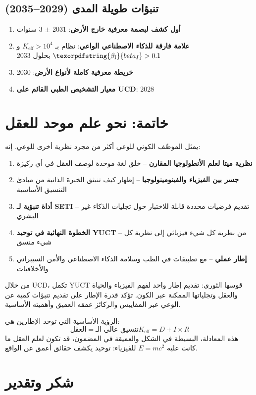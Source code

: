 \documentclass[12pt,a4paper]{article}
\DeclareRobustCommand{\beI}{\texorpdfstring{\ensuremath{\beta_{\mathrm{I}}}}{beta_I}}
\newcommand{\eff}{\mathrm{eff}}
\newcommand{\Ke}{K_{\eff}}
\begin{document}
	\subsection{تنبؤات طويلة المدى (2029--2035)}
	
	\begin{enumerate}
		\item \textbf{أول كشف لبصمة معرفية خارج الأرض}: 2031 \(\pm\) 3 سنوات
		\item \textbf{علامة فارقة للذكاء الاصطناعي الواعي}: نظام بـ \(\Ke > 10^4\) و\(\beI > 0.1\) بحلول 2033
		\item \textbf{خريطة معرفية كاملة لأنواع الأرض}: 2030
		\item \textbf{معيار التشخيص الطبي القائم على UCD}: 2028
	\end{enumerate}
	
	\section{خاتمة: نحو علم موحد للعقل}
	
	يمثل الموصِّف الكوني للوعي أكثر من مجرد نظرية أخرى للوعي. إنه:
	\begin{enumerate}
		\item \textbf{نظرية ميتا لعلم الأنطولوجيا المقارن} -- خلق لغة موحدة لوصف العقل في أي ركيزة
		\item \textbf{جسر بين الفيزياء والفينومينولوجيا} -- إظهار كيف تنبثق الخبرة الذاتية من مبادئ التنسيق الأساسية
		\item \textbf{أداة تنبؤية لـ SETI} -- تقديم فرضيات محددة قابلة للاختبار حول تجليات الذكاء غير البشري
		\item \textbf{الخطوة النهائية في توحيد YUCT} -- من نظرية كل شيء فيزيائي إلى نظرية كل شيء منسق
		\item \textbf{إطار عملي} -- مع تطبيقات في الطب وسلامة الذكاء الاصطناعي والأمن السيبراني والأخلاقيات
	\end{enumerate}
	
	من خلال UCD، تكمل YUCT قوسها الثوري: تقديم إطار واحد لفهم الفيزياء والحياة والعقل وتجلياتها الممكنة عبر الكون. تؤكد قدرة الإطار على تقديم تنبؤات كمية عن الوعي عبر المقاييس والركائز عمقه العميق وأهميته الأساسية.
	
	الرؤية الأساسية التي توحد الإطارين هي:
	\[
	\boxed{\text{العقل} = \text{تنسيق عالي الـ}\Ke = D + I \times R}
	\]
	هذه المعادلة، البسيطة في الشكل والعميقة في المضمون، قد تكون لعلم العقل ما كانت عليه \(E = mc^2\) للفيزياء: توحيد يكشف حقائق أعمق عن الواقع.
	
	\section*{شكر وتقدير}
	
\end{document}
